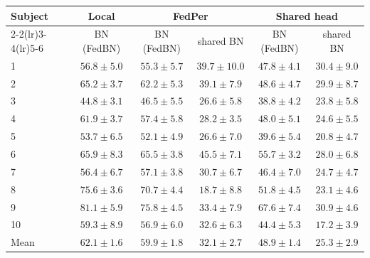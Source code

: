 \begin{tabular}{lccccc}
\toprule
Subject & \multicolumn{1}{c}{Local} & \multicolumn{2}{c}{FedPer} & \multicolumn{2}{c}{Shared head} \\
\cmidrule(lr){2-2}\cmidrule(lr){3-4}\cmidrule(lr){5-6}
 & BN (FedBN) & BN (FedBN) & shared BN & BN (FedBN) & shared BN \\
\midrule
1 & $\mathbf{56.8} \pm 5.0$ & $55.3 \pm 5.7$ & $39.7 \pm 10.0$ & $47.8 \pm 4.1$ & $30.4 \pm 9.0$ \\
2 & $\mathbf{65.2} \pm 3.7$ & $62.2 \pm 5.3$ & $39.1 \pm 7.9$ & $48.6 \pm 4.7$ & $29.9 \pm 8.7$ \\
3 & $44.8 \pm 3.1$ & $\mathbf{46.5} \pm 5.5$ & $26.6 \pm 5.8$ & $38.8 \pm 4.2$ & $23.8 \pm 5.8$ \\
4 & $\mathbf{61.9} \pm 3.7$ & $57.4 \pm 5.8$ & $28.2 \pm 3.5$ & $48.0 \pm 5.1$ & $24.6 \pm 5.5$ \\
5 & $\mathbf{53.7} \pm 6.5$ & $52.1 \pm 4.9$ & $26.6 \pm 7.0$ & $39.6 \pm 5.4$ & $20.8 \pm 4.7$ \\
6 & $\mathbf{65.9} \pm 8.3$ & $65.5 \pm 3.8$ & $45.5 \pm 7.1$ & $55.7 \pm 3.2$ & $28.0 \pm 6.8$ \\
7 & $56.4 \pm 6.7$ & $\mathbf{57.1} \pm 3.8$ & $30.7 \pm 6.7$ & $46.4 \pm 7.0$ & $24.7 \pm 4.7$ \\
8 & $\mathbf{75.6} \pm 3.6$ & $70.7 \pm 4.4$ & $18.7 \pm 8.8$ & $51.8 \pm 4.5$ & $23.1 \pm 4.6$ \\
9 & $\mathbf{81.1} \pm 5.9$ & $75.8 \pm 4.5$ & $33.4 \pm 7.9$ & $67.6 \pm 7.4$ & $30.9 \pm 4.6$ \\
10 & $\mathbf{59.3} \pm 8.9$ & $56.9 \pm 6.0$ & $32.6 \pm 6.3$ & $44.4 \pm 5.3$ & $17.2 \pm 3.9$ \\
\midrule
Mean & $\mathbf{62.1} \pm 1.6$ & $59.9 \pm 1.8$ & $32.1 \pm 2.7$ & $48.9 \pm 1.4$ & $25.3 \pm 2.9$ \\
\bottomrule
\end{tabular}
